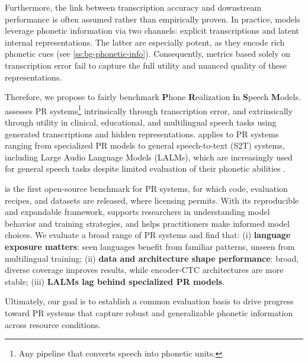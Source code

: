 Furthermore, the link between transcription accuracy and downstream performance is often assumed rather than empirically proven. In practice, models leverage phonetic information via two channels: explicit transcriptions and latent internal representations. The latter are especially potent, as they encode rich phonetic cues (see \autoref{ss:bg-phonetic-info}). Consequently, metrics based solely on transcription error fail to capture the full utility and nuanced quality of these representations.


Therefore, we propose \textbf{\bench} to fairly benchmark \textbf{P}hone \textbf{R}ealization \textbf{i}n \textbf{S}peech \textbf{M}odels.
\bench assesses PR systems\footnote{Any pipeline that converts speech into phonetic units.} intrinsically through transcription error, and extrinsically through utility in clinical, educational, and multilingual speech tasks using generated transcriptions and hidden representations. 
\bench applies to PR systems ranging from specialized PR models to general speech-to-text (S2T) systems, including Large Audio Language Models (LALMs), which are increasingly used for general speech tasks despite limited evaluation of their phonetic abilities \citep{peng2024slmsurvey, arora2025landscape}. 

\bench is the first open-source benchmark for PR systems, for which code, evaluation recipes, and datasets are released, where licensing permits.
With its reproducible and expandable framework, \bench supports researchers in understanding model behavior and training strategies, and helps practitioners make informed model choices. 
We evaluate a broad range of PR systems and find that:
(i) \textbf{language exposure matters}: seen languages benefit from familiar patterns, unseen from multilingual training;
(ii) \textbf{data and architecture shape performance}: broad, diverse coverage improves results, while encoder-CTC architectures are more stable;
(iii) \textbf{LALMs lag behind specialized PR models}.

Ultimately, our goal is to establish a common evaluation basis to drive progress toward PR systems that capture robust and generalizable phonetic information across resource conditions.